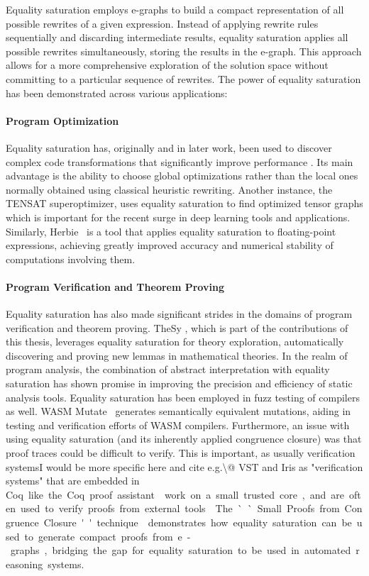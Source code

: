 Equality saturation employs e-graphs to build a compact representation of all possible rewrites of a given expression. 
Instead of applying rewrite rules sequentially and discarding intermediate results, equality saturation applies all possible rewrites simultaneously, storing the results in the e-graph. 
This approach allows for a more comprehensive exploration of the solution space without committing to a particular sequence of rewrites. 
The power of equality saturation has been demonstrated across various applications:

\paragraph{Program Optimization} Equality saturation has, originally and in later work, been used to discover complex code transformations that significantly improve performance \cite{eqsat}.
Its main advantage is the ability to choose global optimizations rather than the local ones normally obtained using classical heuristic rewriting.
Another instance, the TENSAT superoptimizer, uses equality saturation to find optimized tensor graphs \cite{tensat} which is important for the recent surge in deep learning tools and applications.
Similarly, Herbie~\cite{herbie} is a tool that applies equality saturation to floating-point expressions, achieving greatly improved accuracy and numerical stability of computations involving them.

\paragraph{Program Verification and Theorem Proving}
Equality saturation has also made significant strides in the domains of program verification and theorem proving. 
TheSy \cite{thesy}, which is part of the contributions of this thesis, leverages equality saturation for theory exploration, automatically discovering and proving new lemmas in mathematical theories.
In the realm of program analysis, the combination of abstract interpretation with equality saturation \cite{abstracteqsat} has shown promise in improving the precision and efficiency of static analysis tools. 
Equality saturation has been employed in fuzz testing of compilers as well. 
WASM Mutate~\cite{arteaga2022wasm} generates semantically equivalent mutations, aiding in testing and verification efforts of WASM compilers. 
Furthermore, an issue with using equality saturation (and its inherently applied congruence closure) was that proof traces could be difficult to verify. 
This is important, as usually verification systems\SI{I would be more specific here and cite e.g.\@ VST and Iris as "verification systems" that are embedded in Coq} like the Coq proof assistant \cite{Coq:manual} work on a small trusted core, and are often used to verify proofs from external tools \cite{armand2011modular, coqhammer}. 
The ``Small Proofs from Congruence Closure'' technique \cite{flatt2022small} demonstrates how equality saturation can be used to generate compact proofs from e-graphs, bridging the gap for equality saturation to be used in automated reasoning systems.

